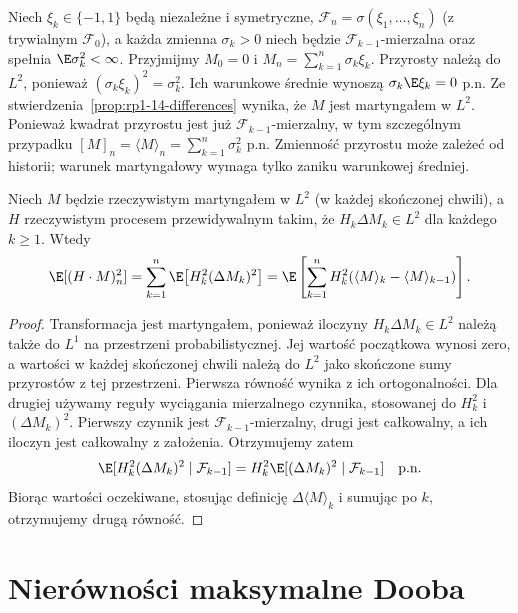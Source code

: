 \begin{przyklad}
Niech $\xi_k\in\{-1,1\}$ będą niezależne
i symetryczne, $\mathcal F_n=\sigma(\xi_1,\ldots,\xi_n)$
(z trywialnym $\mathcal F_0$), a każda zmienna
$\sigma_k>0$ niech będzie $\mathcal F_{k-1}$-mierzalna
oraz spełnia $\E\sigma_k^2<\infty$.
Przyjmijmy $M_0=0$ i $M_n=\sum_{k=1}^n\sigma_k\xi_k$.
Przyrosty należą do $L^2$, ponieważ
$(\sigma_k\xi_k)^2=\sigma_k^2$. Ich warunkowe
średnie wynoszą $\sigma_k\E\xi_k=0$ p.n.
Ze stwierdzenia~\ref{prop:rp1-14-differences}
wynika, że $M$ jest martyngałem w $L^2$.
Ponieważ kwadrat przyrostu jest już
$\mathcal F_{k-1}$-mierzalny, w tym szczególnym
przypadku $[M]_n=\langle M\rangle_n=\sum_{k=1}^n\sigma_k^2$
p.n.
Zmienność przyrostu może zależeć od historii;
warunek martyngałowy wymaga tylko zaniku
warunkowej średniej.
\end{przyklad}

\begin{stwierdzenie}
\label{prop:rp1-14-transform-isometry}
Niech $M$ będzie rzeczywistym martyngałem w $L^2$
(w każdej skończonej chwili), a $H$ rzeczywistym
procesem przewidywalnym takim, że
$H_k\Delta M_k\in L^2$ dla każdego $k\geq1$.
Wtedy
\[
\E[(H\cdot M)_n^2]
=\sum_{k=1}^n\E\bigl[H_k^2(\Delta M_k)^2\bigr]
=\E\left[\sum_{k=1}^n H_k^2
(\langle M\rangle_k-\langle M\rangle_{k-1})\right].
\]
\end{stwierdzenie}
\begin{proof}
Transformacja jest martyngałem, ponieważ iloczyny
$H_k\Delta M_k\in L^2$ należą także do $L^1$
na przestrzeni probabilistycznej. Jej wartość
początkowa wynosi zero, a wartości w każdej
skończonej chwili należą do $L^2$ jako skończone
sumy przyrostów z tej przestrzeni.
Pierwsza równość wynika z ich ortogonalności.
Dla drugiej używamy reguły wyciągania mierzalnego
czynnika, stosowanej do $H_k^2$ i $(\Delta M_k)^2$.
Pierwszy czynnik jest $\mathcal F_{k-1}$-mierzalny,
drugi jest całkowalny, a ich iloczyn jest
całkowalny z założenia. Otrzymujemy zatem
\[
\E[H_k^2(\Delta M_k)^2\mid\mathcal F_{k-1}]
=H_k^2\E[(\Delta M_k)^2\mid\mathcal F_{k-1}]
\quad\text{p.n.}
\]
Biorąc wartości oczekiwane, stosując definicję
$\Delta\langle M\rangle_k$ i sumując po $k$,
otrzymujemy drugą równość.
\end{proof}

\section{Nierówności maksymalne Dooba}

